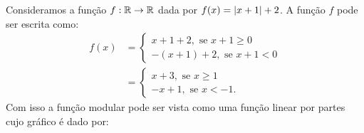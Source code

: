 \begin{exem}
  Consideramos a função $f: \mathbb{R} \rightarrow \mathbb{R}$ dada por $f(x)= \left|x+1\right|+2$. A função $f$ pode ser escrita como:
    \begin{align*}
        f(x)& = 
        \begin{cases}
         x +1 +2, \text{ se } x+1 \geq 0 \\
         -(x +1) +2, \text{ se } x+1 < 0
        \end{cases} \\
        & = 
        \begin{cases}
         x +3, \text{ se } x \geq 1 \\
         -x +1, \text{ se } x < -1.
        \end{cases}
    \end{align*}
  Com isso a função modular pode ser vista como uma função linear por partes cujo gráfico é dado por:
  \begin{center}
\end{center}
\end{exem}

